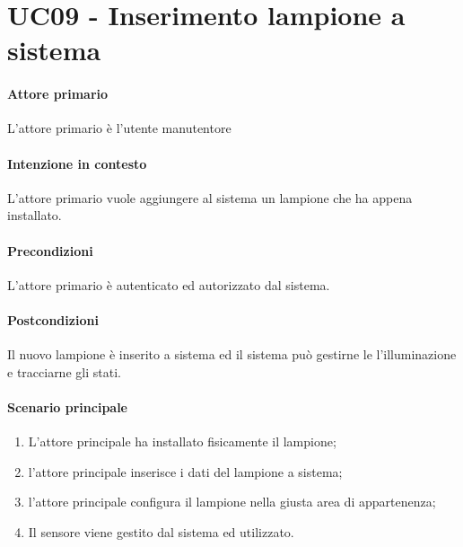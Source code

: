 \section{UC09 - Inserimento lampione a sistema}

\paragraph{Attore primario} L'attore primario è l'utente manutentore
\paragraph{Intenzione in contesto} L'attore primario vuole aggiungere al sistema un lampione che ha appena installato.

\paragraph{Precondizioni} L'attore primario è autenticato ed autorizzato dal sistema.

\paragraph{Postcondizioni} Il nuovo lampione è inserito a sistema ed il sistema può gestirne le l'illuminazione e tracciarne gli stati.

\paragraph{Scenario principale}

\begin{enumerate}
    \item L'attore principale ha installato fisicamente il lampione;
    \item l'attore principale inserisce i dati del lampione a sistema;
    \item l'attore principale configura il lampione nella giusta area di appartenenza;
    \item Il sensore viene gestito dal sistema ed utilizzato.
\end{enumerate}

